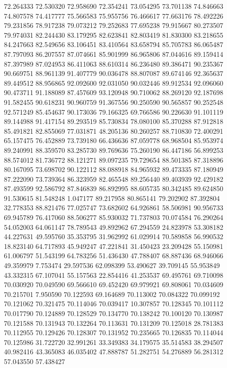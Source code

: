 72.264333
72.530320
72.958690
72.354241
73.054295
73.701138
74.846663
74.807578
74.417777
75.566583
75.955756
76.466617
77.663176
78.492226
79.231856
78.917238
79.073212
79.252683
77.695238
79.915667
80.273507
79.974031
82.244430
83.179295
82.623841
82.803419
81.830300
83.218655
84.247663
82.549656
83.106451
83.410564
83.658794
85.705783
86.065487
87.797093
86.207557
87.074661
85.901999
86.965806
87.044616
89.159414
87.397989
87.024953
86.411063
88.610314
86.236480
89.386471
90.235367
90.669751
88.961139
91.407779
90.036478
88.807087
89.674146
92.365637
89.449512
88.956865
92.092600
92.031050
90.032446
89.912534
92.096060
90.473711
91.188089
87.457609
93.120948
90.710062
88.269120
92.187698
91.582455
90.618231
90.960759
91.367556
90.250590
90.565857
90.252548
92.571249
85.454637
90.173036
79.166325
69.766586
90.226630
91.101119
89.144988
91.417154
89.293519
85.730834
78.080100
85.370288
87.912818
85.491821
82.855069
77.031871
48.205136
80.260257
88.710830
72.400291
65.157475
76.452889
73.739180
66.436636
87.059778
68.968504
85.953974
89.240991
88.359570
83.285730
89.769636
75.260190
86.447186
56.899253
88.574012
81.736772
88.121271
89.097235
79.729654
88.501385
87.318896
80.167095
73.698702
90.122112
88.088918
84.965932
89.473335
87.180949
87.222090
73.739364
86.323959
82.465548
89.256440
89.403939
92.429182
87.493599
92.586792
87.846839
86.892995
88.605735
80.342485
89.624850
91.530615
81.548248
1.047177
89.217958
80.865141
79.202902
87.392804
32.778353
88.821476
77.025747
73.682602
64.926861
58.506981
90.956733
69.945789
76.417060
88.506277
85.930032
71.737803
70.074584
76.290264
54.052003
64.061147
78.789543
49.892962
67.294559
24.823978
53.308182
44.227631
49.595760
35.353795
31.962992
61.029914
70.589858
56.990532
18.823140
64.717893
45.949247
47.221841
31.450423
23.209428
55.150981
61.006797
51.543199
64.783256
51.436430
47.788407
68.887436
68.946066
49.359979
7.753474
29.597536
62.098399
53.490627
39.709145
55.953849
43.332315
67.107041
55.157563
22.854416
41.253537
69.495761
69.710098
70.030920
70.049590
69.566610
69.452420
69.979921
69.808061
70.034609
70.215701
7.950590
70.122593
69.164689
70.113002
70.084322
70.099192
70.121062
70.321475
70.114046
70.039417
10.307857
70.128345
70.101112
70.017790
70.124889
70.128529
70.134770
70.138242
70.100120
70.130987
70.121588
70.131943
70.132264
70.113631
70.131209
70.125018
28.781383
70.112955
70.129426
70.128307
70.131952
70.235665
70.126835
70.114044
70.125986
31.722720
32.991261
33.349383
34.179575
35.514583
38.294507
40.982416
43.365083
46.035402
47.888787
51.282751
54.276889
56.281312
57.043550
57.438427
